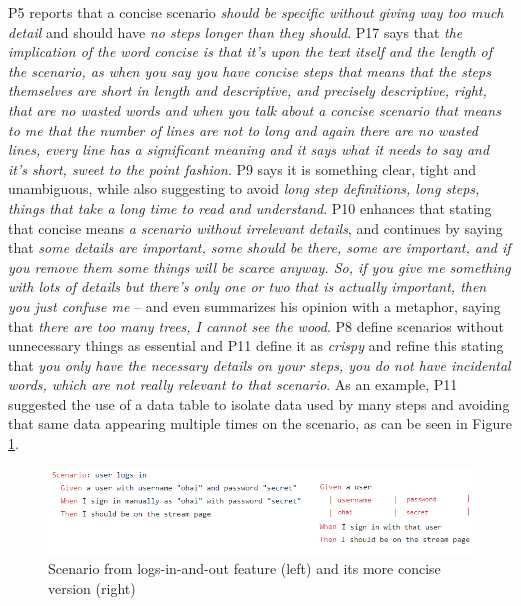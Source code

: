 P5 reports that a concise scenario \textit{should be specific without giving way too much detail} and should have \textit{no steps longer than they should}. P17 says that \textit{the implication of the word concise is that it's upon the text itself and the length of the scenario, as when you say you have concise steps that means that the steps themselves are short in length and descriptive, and precisely descriptive, right, that are no wasted words and when you talk about a concise scenario that means to me that the number of lines are not to long and again there are no wasted lines, every line has a significant meaning and it says what it needs to say and it's short, sweet to the point fashion}. P9 says it is something clear, tight and unambiguous, while also suggesting to avoid \textit{long step definitions, long steps, things that take a long time to read and understand}. P10 enhances that stating that concise means \textit{a scenario without irrelevant details}, and continues by saying that \textit{some details are important, some should be there, some are important, and if you remove them some things will be scarce anyway. So, if you give me something with lots of details but there's only one or two that is actually important, then you just confuse me} -- and even summarizes his opinion with a metaphor, saying that \textit{there are too many trees, I cannot see the wood}. P8 define scenarios without unnecessary things as essential and P11 define it as \textit{crispy} and refine this stating that \textit{you only have the necessary details on your steps, you do not have incidental words, which are not really relevant to that scenario}. As an example, P11 suggested the use of a data table to isolate data used by many steps and avoiding that same data appearing multiple times on the scenario, as can be seen in Figure \ref{fig:concise_unnecessary_details_parameters_repetition}.

\begin{figure}[t]
	\centering
	\includegraphics[scale=1.0]{images/logs_in_and_out_feature_parameters_repetitions_not_concise_P11}
	\caption[Scenario with a more concise version]{Scenario from logs-in-and-out feature (left) and its more concise version (right)}
	\label{fig:concise_unnecessary_details_parameters_repetition}
\end{figure}

